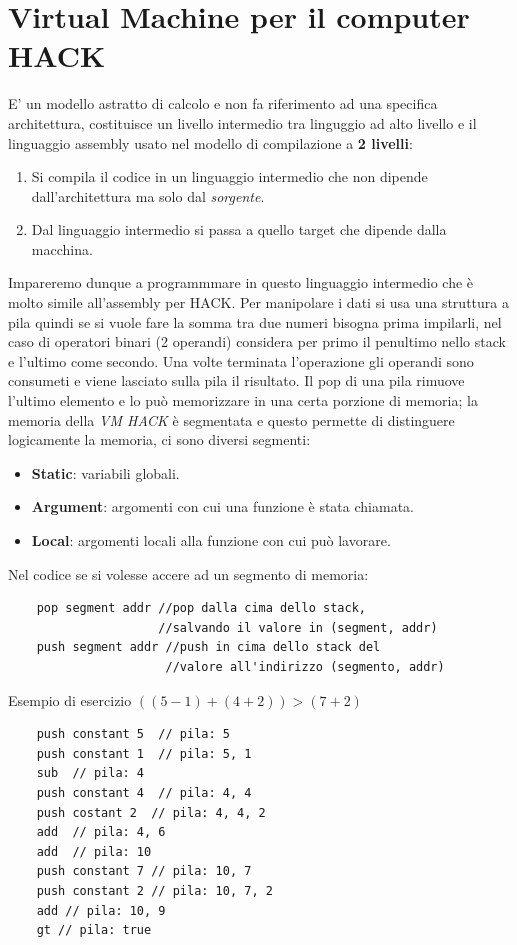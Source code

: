 \documentclass{article}
\begin{document}
\section{Virtual Machine per il computer HACK}
E' un modello astratto di calcolo e non fa riferimento ad una specifica architettura, costituisce un livello intermedio tra linguggio ad alto livello e il linguaggio assembly usato nel modello di compilazione a \textbf{2 livelli}:\begin{enumerate}
    \item Si compila il codice in un linguaggio intermedio che non dipende dall'architettura ma solo dal \textit{sorgente}.
    \item Dal linguaggio intermedio si passa a quello target che dipende dalla macchina.
\end{enumerate}
Impareremo dunque a programmmare in questo linguaggio intermedio che è molto simile all'assembly per HACK. Per manipolare i dati si usa una struttura a pila quindi se si vuole fare la somma tra due numeri bisogna prima impilarli, nel caso di operatori binari (2 operandi) considera per primo il penultimo nello stack e l'ultimo come secondo. Una volte terminata l'operazione gli operandi sono consumeti e viene lasciato sulla pila il risultato. Il pop di una pila rimuove l'ultimo elemento e lo può memorizzare in una certa porzione di memoria; la memoria della \textit{VM HACK} è segmentata e questo permette di distinguere logicamente la memoria, ci sono diversi segmenti: 
\begin{itemize}
    \item \textbf{Static}: variabili globali.
    \item \textbf{Argument}: argomenti con cui una funzione è stata chiamata.
    \item \textbf{Local}: argomenti locali alla funzione con cui può lavorare.
\end{itemize}

Nel codice se si volesse accere ad un segmento di memoria:
\begin{verbatim}
    pop segment addr //pop dalla cima dello stack, 
                     //salvando il valore in (segment, addr)
    push segment addr //push in cima dello stack del 
                      //valore all'indirizzo (segmento, addr)
\end{verbatim}

Esempio di esercizio $((5-1)+(4+2)) > (7+2)$
\begin{verbatim}
    push constant 5  // pila: 5
    push constant 1  // pila: 5, 1
    sub  // pila: 4
    push constant 4  // pila: 4, 4
    push costant 2  // pila: 4, 4, 2
    add  // pila: 4, 6
    add  // pila: 10
    push constant 7 // pila: 10, 7
    push constant 2 // pila: 10, 7, 2
    add // pila: 10, 9
    gt // pila: true
\end{verbatim}
\end{document}
